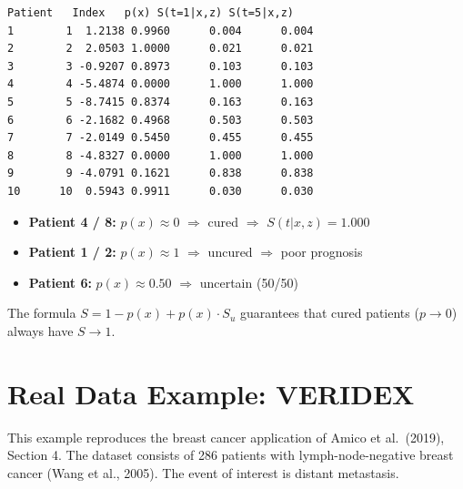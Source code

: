 \documentclass[12pt,a4paper]{article}
\begin{document}
\begin{lstlisting}[style=Routput]
   Patient   Index   p(x) S(t=1|x,z) S(t=5|x,z)
1        1  1.2138 0.9960      0.004      0.004
2        2  2.0503 1.0000      0.021      0.021
3        3 -0.9207 0.8973      0.103      0.103
4        4 -5.4874 0.0000      1.000      1.000
5        5 -8.7415 0.8374      0.163      0.163
6        6 -2.1682 0.4968      0.503      0.503
7        7 -2.0149 0.5450      0.455      0.455
8        8 -4.8327 0.0000      1.000      1.000
9        9 -4.0791 0.1621      0.838      0.838
10      10  0.5943 0.9911      0.030      0.030
\end{lstlisting}

\begin{infobox}
\begin{itemize}
  \item \textbf{Patient 4 / 8:} $p(x) \approx 0$ $\Rightarrow$
    cured $\Rightarrow$ $S(t|x,z) = 1.000$ \\
  \item \textbf{Patient 1 / 2:} $p(x) \approx 1$ $\Rightarrow$
    uncured $\Rightarrow$ poor prognosis \\
  \item \textbf{Patient 6:} $p(x) \approx 0.50$ $\Rightarrow$
    uncertain (50/50)
\end{itemize}
The formula $S = 1 - p(x) + p(x) \cdot S_u$ guarantees that
cured patients ($p \to 0$) always have $S \to 1$.
\end{infobox}

\section{Real Data Example: VERIDEX}

This example reproduces the breast cancer application of Amico
et al.\ (2019), Section 4. The dataset consists of 286 patients
with lymph-node-negative breast cancer (Wang et al., 2005).
The event of interest is distant metastasis.
\end{document}
